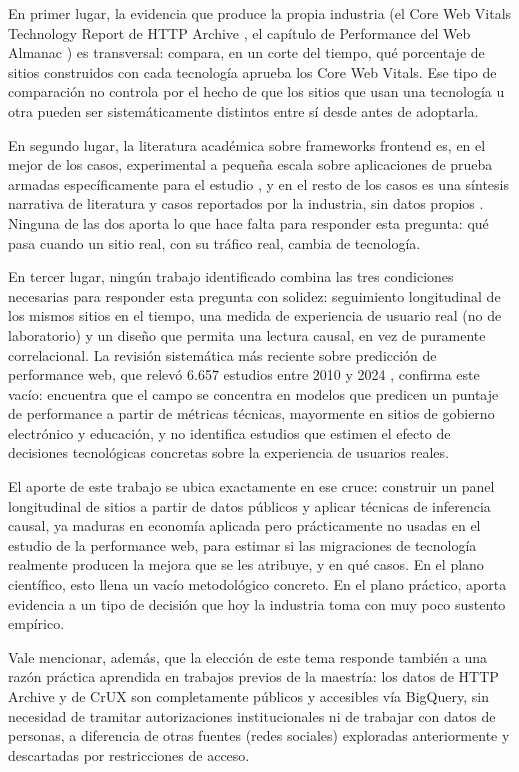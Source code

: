 \documentclass[12pt, a4paper]{article}
\begin{document}
En primer lugar, la evidencia que produce la propia industria (el Core Web Vitals Technology Report de HTTP Archive \cite{httparchive2025cwvtech}, el capítulo de Performance del Web Almanac \cite{httparchive2025almanac}) es transversal: compara, en un corte del tiempo, qué porcentaje de sitios construidos con cada tecnología aprueba los Core Web Vitals. Ese tipo de comparación no controla por el hecho de que los sitios que usan una tecnología u otra pueden ser sistemáticamente distintos entre sí desde antes de adoptarla.

En segundo lugar, la literatura académica sobre frameworks frontend es, en el mejor de los casos, experimental a pequeña escala sobre aplicaciones de prueba armadas específicamente para el estudio \cite{tong2023comparative}, y en el resto de los casos es una síntesis narrativa de literatura y casos reportados por la industria, sin datos propios \cite{tulsyan2024impact}. Ninguna de las dos aporta lo que hace falta para responder esta pregunta: qué pasa cuando un sitio real, con su tráfico real, cambia de tecnología.

En tercer lugar, ningún trabajo identificado combina las tres condiciones necesarias para responder esta pregunta con solidez: seguimiento longitudinal de los mismos sitios en el tiempo, una medida de experiencia de usuario real (no de laboratorio) y un diseño que permita una lectura causal, en vez de puramente correlacional. La revisión sistemática más reciente sobre predicción de performance web, que relevó 6.657 estudios entre 2010 y 2024 \cite{ghattas2025review}, confirma este vacío: encuentra que el campo se concentra en modelos que predicen un puntaje de performance a partir de métricas técnicas, mayormente en sitios de gobierno electrónico y educación, y no identifica estudios que estimen el efecto de decisiones tecnológicas concretas sobre la experiencia de usuarios reales.

El aporte de este trabajo se ubica exactamente en ese cruce: construir un panel longitudinal de sitios a partir de datos públicos y aplicar técnicas de inferencia causal, ya maduras en economía aplicada pero prácticamente no usadas en el estudio de la performance web, para estimar si las migraciones de tecnología realmente producen la mejora que se les atribuye, y en qué casos. En el plano científico, esto llena un vacío metodológico concreto. En el plano práctico, aporta evidencia a un tipo de decisión que hoy la industria toma con muy poco sustento empírico.

Vale mencionar, además, que la elección de este tema responde también a una razón práctica aprendida en trabajos previos de la maestría: los datos de HTTP Archive y de CrUX son completamente públicos y accesibles vía BigQuery, sin necesidad de tramitar autorizaciones institucionales ni de trabajar con datos de personas, a diferencia de otras fuentes (redes sociales) exploradas anteriormente y descartadas por restricciones de acceso.
\end{document}
